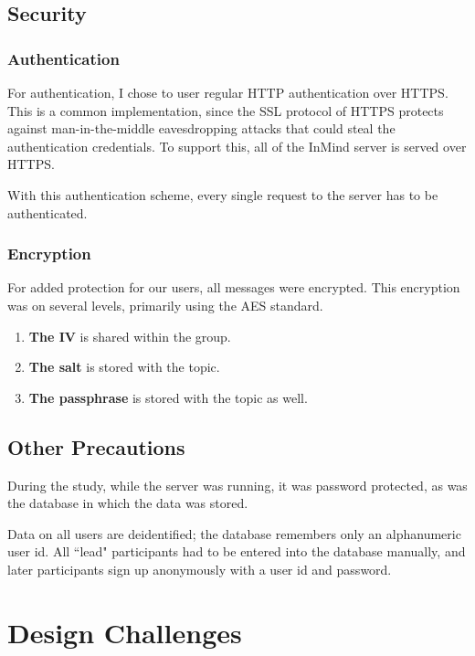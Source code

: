     \subsection{Security}
    \label{sec:security}
      \subsubsection{Authentication}
        For authentication, I chose to user regular HTTP authentication over HTTPS.
        This is a common implementation, since the SSL protocol of HTTPS
        protects against man-in-the-middle
        eavesdropping attacks that could steal the authentication credentials.
        To support this, all of the InMind server is served over HTTPS.

        With this authentication scheme,
        every single request to the server has to be authenticated.

      \subsubsection{Encryption}
        For added protection for our users, all messages were encrypted.
        This encryption was on several levels, primarily using the AES standard.

        \begin{enumerate}
        \item \textbf{The IV} is shared within the group.
        \item \textbf{The salt} is stored with the topic.
        \item \textbf{The passphrase} is stored with the topic as well.
        \end{enumerate}

      \subsection{Other Precautions}
      During the study, while the server was running, it was password protected,
      as was the database in which the data was stored.

      Data on all users are deidentified;
      the database remembers only an alphanumeric user id.
      All ``lead" participants had to be entered into the database manually,
      and later participants sign up anonymously with a user id and password.

  \section{Design Challenges}
